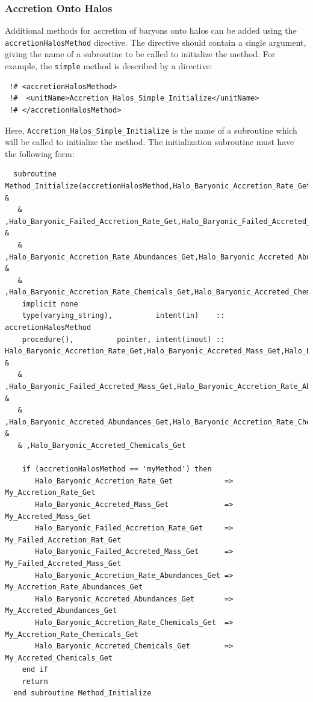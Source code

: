 \subsubsection{Accretion Onto Halos}

Additional methods for accretion of baryons onto halos can be added using the {\tt accretionHalosMethod} directive. The directive should contain a single argument, giving the name of a subroutine to be called to initialize the method. For example, the {\tt simple} method is described by a directive:
\begin{verbatim}
 !# <accretionHalosMethod>
 !#  <unitName>Accretion_Halos_Simple_Initialize</unitName>
 !# </accretionHalosMethod>
\end{verbatim}
Here, {\tt Accretion\_Halos\_Simple\_Initialize} is the name of a subroutine which will be called to initialize the method. The initialization subroutine must have the following form:
\begin{verbatim}
  subroutine Method_Initialize(accretionHalosMethod,Halo_Baryonic_Accretion_Rate_Get,Halo_Baryonic_Accreted_Mass_Get &
   & ,Halo_Baryonic_Failed_Accretion_Rate_Get,Halo_Baryonic_Failed_Accreted_Mass_Get &
   & ,Halo_Baryonic_Accretion_Rate_Abundances_Get,Halo_Baryonic_Accreted_Abundances_Get, &
   & ,Halo_Baryonic_Accretion_Rate_Chemicals_Get,Halo_Baryonic_Accreted_Chemicals_Get)
    implicit none
    type(varying_string),          intent(in)    :: accretionHalosMethod
    procedure(),          pointer, intent(inout) :: Halo_Baryonic_Accretion_Rate_Get,Halo_Baryonic_Accreted_Mass_Get,Halo_Baryonic_Failed_Accretion_Rate_Get &
   & ,Halo_Baryonic_Failed_Accreted_Mass_Get,Halo_Baryonic_Accretion_Rate_Abundances_Get &
   & ,Halo_Baryonic_Accreted_Abundances_Get,Halo_Baryonic_Accretion_Rate_Chemicals_Get &
   & ,Halo_Baryonic_Accreted_Chemicals_Get
    
    if (accretionHalosMethod == 'myMethod') then
       Halo_Baryonic_Accretion_Rate_Get            => My_Accretion_Rate_Get
       Halo_Baryonic_Accreted_Mass_Get             => My_Accreted_Mass_Get
       Halo_Baryonic_Failed_Accretion_Rate_Get     => My_Failed_Accretion_Rat_Get
       Halo_Baryonic_Failed_Accreted_Mass_Get      => My_Failed_Accreted_Mass_Get
       Halo_Baryonic_Accretion_Rate_Abundances_Get => My_Accretion_Rate_Abundances_Get
       Halo_Baryonic_Accreted_Abundances_Get       => My_Accreted_Abundances_Get
       Halo_Baryonic_Accretion_Rate_Chemicals_Get  => My_Accretion_Rate_Chemicals_Get
       Halo_Baryonic_Accreted_Chemicals_Get        => My_Accreted_Chemicals_Get
    end if
    return
  end subroutine Method_Initialize
\end{verbatim}
